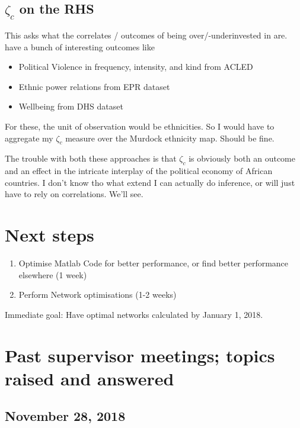 \documentclass[11pt, oneside]{article}   	%
\begin{document}
\subsection{$\zeta_{c}$ on the RHS}
This asks what the correlates / outcomes of being over/-underinvested in are. \cite{michalopoulos_long-run_2016} have a bunch of interesting outcomes like
\begin{itemize}
  \item Political Violence in frequency, intensity, and kind from ACLED
  \item Ethnic power relations from EPR dataset
  \item Wellbeing from DHS dataset
\end{itemize}

For these, the unit of observation would be ethnicities. So I would have to aggregate my $\zeta_{c}$ measure over the Murdock ethnicity map. Should be fine.

The trouble with both these approaches is that $\zeta_{c}$ is obviously both an outcome and an effect in the intricate interplay of the political economy of African countries. I don't know tho what extend I can actually do inference, or will just have to rely on correlations. We'll see.


\section{Next steps}

\begin{enumerate}
  \item Optimise Matlab Code for better performance, or find better performance elsewhere (1 week)
  \item Perform Network optimisations (1-2 weeks)
\end{enumerate}

Immediate goal: Have optimal networks calculated by January 1, 2018.

\section*{Past supervisor meetings; topics raised and answered}

\subsection*{November 28, 2018}
\end{document}
